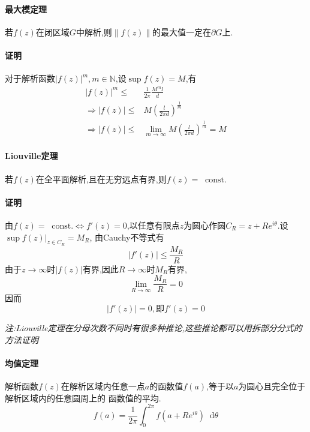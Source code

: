 \documentclass[UTF8]{ctexart}
\newcommand{\dif}{\mathop{}\!\mathrm{d}}
\newcommand{\const}{\mathop{}\!\mathrm{const.}}
\begin{document}
\paragraph{最大模定理}
若$f(z)$在闭区域$G$中解析,则$\left\| f(z) \right\|$的最大值一定在$\partial G$上.

\paragraph{证明}
对于解析函数$\left| f(z) \right|^{m},m\in \mathbb{N}$,设$\sup f(z)=M$,有
\begin{equation}
  \begin{aligned}
  \left| f(z) \right|^{m}\leqslant&\frac{1}{2\pi}\frac{M^{m}l}{d} \\
  \Rightarrow \left| f(z) \right| \leqslant& M(\frac{l}{2\pi d})^{\frac{1}{m}} \\
  \Rightarrow \left| f(z) \right| \leqslant& \lim_{m \to \infty} M(\frac{l}{2\pi d})^{\frac{1}{m}}=M
  \end{aligned}
\end{equation}

\paragraph{Liouville定理}
若$f(z)$在全平面解析,且在无穷远点有界,则$f(z)=\const$

\paragraph{证明}
由$f(z)=\const\Leftrightarrow f'(z)=0$,以任意有限点$z$为圆心作圆$C_{R}=z+Re^{i\theta}$.设$\sup f(z)|_{z\in C_{R}}=M_{R}$,
由Cauchy不等式有
\begin{equation}
  \left| f'(z) \right|\leqslant\frac{M_{R}}{R}
\end{equation}
由于$z\rightarrow \infty $时$\left| f(z) \right|$有界,因此$R\rightarrow\infty$时$M_{R}$有界,
\begin{equation}
  \lim_{R \to \infty} \frac{M_{R}}{R}=0
\end{equation}
因而
\begin{equation}
  \left| f'(z) \right|=0,即f'(z)=0
\end{equation}

\textit{注:Liouville定理在分母次数不同时有很多种推论,这些推论都可以用拆部分分式的方法证明}

\paragraph{均值定理}
解析函数\(f(z)\)在解析区域内任意一点\(a\)的函数值\(f(a)\),等于以\(a\)为圆心且完全位于解析区域内的任意圆周上的
函数值的平均.
\begin{equation}
  f(a)=\frac{1}{2\pi}\int_{0}^{2\pi}f(a+Re^{i\theta})\dif \theta
\end{equation}
\end{document}

